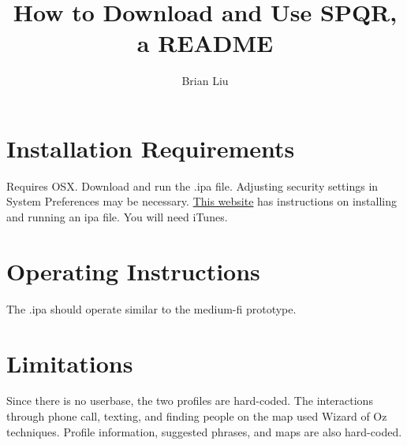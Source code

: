 \documentclass{article}
\title{How to Download and Use SPQR, a README}
\author{Brian Liu}
\begin{document}
\maketitle

\section{Installation Requirements}
Requires OSX. Download and run the .ipa file. Adjusting security settings in System Preferences may be necessary. \href{https://www.techwalla.com/articles/how-to-install-ipa-on-a-mac}{This website} has instructions on installing and running an ipa file. You will need iTunes.

\section{Operating Instructions}
The .ipa should operate similar to the medium-fi prototype.

\section{Limitations}
Since there is no userbase, the two profiles are hard-coded. The interactions through phone call, texting, and finding people on the map used Wizard of Oz techniques. Profile information, suggested phrases, and maps are also hard-coded.
\end{document}
